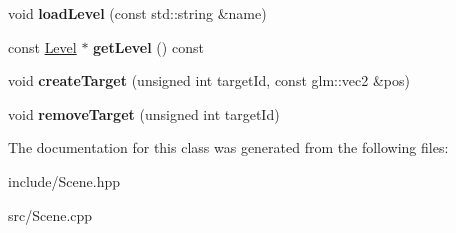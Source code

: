 \begin{DoxyCompactItemize}
\item 
\hypertarget{class_scene_ae854b91fa936f14feb3c60604abfc921}{void {\bfseries load\-Level} (const std\-::string \&name)}\label{class_scene_ae854b91fa936f14feb3c60604abfc921}

\item 
\hypertarget{class_scene_a17010fc67e4338e62813a94e6808cb06}{const \hyperlink{class_level}{Level} $\ast$ {\bfseries get\-Level} () const }\label{class_scene_a17010fc67e4338e62813a94e6808cb06}

\item 
\hypertarget{class_scene_a07fdb7e156c7efb227c6f413ddfa77f0}{void {\bfseries create\-Target} (unsigned int target\-Id, const glm\-::vec2 \&pos)}\label{class_scene_a07fdb7e156c7efb227c6f413ddfa77f0}

\item 
\hypertarget{class_scene_a660b97de1dcd68ff53a61dc38b034153}{void {\bfseries remove\-Target} (unsigned int target\-Id)}\label{class_scene_a660b97de1dcd68ff53a61dc38b034153}

\end{DoxyCompactItemize}


The documentation for this class was generated from the following files\-:\begin{DoxyCompactItemize}
\item 
include/Scene.\-hpp\item 
src/Scene.\-cpp\end{DoxyCompactItemize}
